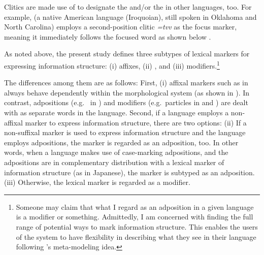 \noindent Clitics are made use of to designate the  and/or the
 in other languages, too. For example,  (a native
American language (Iroquoian), still spoken in Oklahoma and North
Carolina) employs a second-position clitic \textit{=tvv} as the focus
marker, meaning it immediately follows the focused word as shown below
\citep{montgomery:08}.




As noted above, the present study defines three subtypes of lexical
markers for expressing information structure: (i) affixes, (ii)
, and (iii) modifiers.\footnote{Someone may claim
  that what I regard as an adposition in a given language is a
  modifier or something. Admittedly, I am concerned with finding the
  full range of potential ways to mark information structure. This
  enables the users of the \lingo {} system to have
  flexibility in describing what they see in their language following
  \citet{poulson:11}'s meta-modeling idea.}




The differences among them are as follows: First, (i) affixal markers
such as \nun in  always behave dependently within the
morphological system (as shown in ). In contrast,
adpositions (e.g.\  in
) and modifiers (e.g.\ particles in 
 and  ) are dealt
with as separate words in the language. Second, if a language employs
a non-affixal marker to express information structure, there are two
options: (ii) If a non-suffixal marker is used to express information
structure and the language employs adpositions, the marker is regarded
as an adposition, too. In other words, when a language makes use of
case-marking adpositions, and the adpositions are in complementary
distribution with a lexical marker of information structure (as in
Japanese), the marker is subtyped as an adposition. (iii) Otherwise, the lexical marker is regarded as a
modifier.



